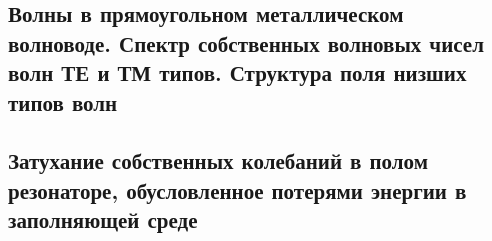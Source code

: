 \subsection{Волны в прямоугольном металлическом волноводе. Спектр собственных волновых чисел волн ТЕ и ТМ типов. Структура поля низших типов волн}



\subsection{Затухание собственных колебаний в полом резонаторе, обусловленное потерями энергии в заполняющей среде}